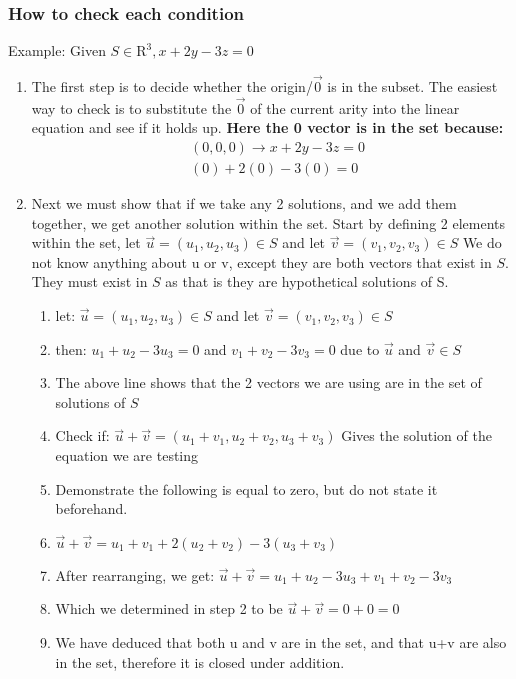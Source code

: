 \documentclass[11pt]{book}
\begin{document}
{\subsubsection{How to check each condition}
\par{Example: Given $S\in\mathrm{R^{3}}, x+2y-3z=0$}
\begin{enumerate}
	\item{The first step is to decide whether the origin/$\vec{0}$ is in the subset. The easiest way to check is to substitute the $\vec{0}$ of the current arity into the linear equation and see if it holds up. \textbf{Here the 0 vector is in the set because:}}
\begin{align*}
	& \left(0,0,0\right)\rightarrow x+2y-3z=0 \\
	& \left(0\right)+2\left(0\right)-3\left(0\right)=0 
\end{align*}
\item{Next we must show that if we take any 2 solutions, and we add them together, we get another solution within the set. Start by defining 2 elements within the set, let $\vec{u}=\left(u_{1},u_{2},u_{3}\right)\in S$ and let $\vec{v}=\left(v_{1},v_{2},v_{3}\right)\in S$ We do not know anything about u or v, except they are both vectors that exist in $S$. They must exist in  $S$ as that is they are hypothetical solutions of S.}
	\begin{enumerate}
		\item{ let: $\vec{u}=\left(u_{1},u_{2},u_{3}\right)\in S$ and let $\vec{v}=\left(v_{1},v_{2},v_{3}\right)\in S$ }
		\item{ then: $u_{1}+u_{2}-3u_{3}=0$ and $v_{1}+v_{2}-3v_{3}=0$  due to $\vec{u}$ and $\vec{v}\in S$ }
		\item{ The above line shows that the 2 vectors we are using are in the set of solutions of $S$ }
		\item{ Check if: $\vec{u}+\vec{v}=\left(u_{1}+v_{1},u_{2}+v_{2},u_{3}+v_{3}\right)$ Gives the solution of the equation we are testing}
		\item{ Demonstrate the following is equal to zero, but do not state it beforehand.}
		\item{ $\vec{u}+\vec{v}=u_{1}+v_{1}+2\left(u_{2}+v_{2}\right)-3\left(u_{3}+v_{3}\right)$}
		\item{ After rearranging, we get: $\vec{u}+\vec{v}=u_{1}+u_{2}-3u_{3}+v_{1}+v_{2}-3v_{3}$}
		\item{ Which we determined in step 2 to be $\vec{u}+\vec{v}=0+0=0$}
		\item{ We have deduced that both u and v are in the set, and that u+v are also in the set, therefore it is closed under addition.}

\end{enumerate}
\end{enumerate}}
\end{document}
